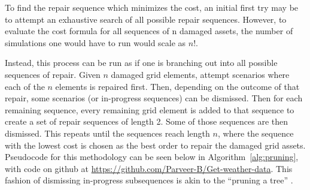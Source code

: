 \documentclass[12pt]{article}
\begin{document}
To find the repair sequence which minimizes the cost, an initial first try may be to attempt an exhaustive search of all possible repair sequences. However, to evaluate the cost formula for all sequences of n damaged assets, the number of simulations one would have to run would scale as $n!$. \par
Instead, this process can be run as if one is branching out into all possible sequences of repair. Given $n$ damaged grid elements, attempt scenarios where each of the $n$ elements is repaired first. Then, depending on the outcome of that repair, some scenarios (or in-progress sequences) can be dismissed. Then for each remaining sequence, every remaining grid element is added to that sequence to create a set of repair sequences of length 2. Some of those sequences are then dismissed. This repeats until the sequences reach length $n$, where the sequence with the lowest cost is chosen as the best order to repair the damaged grid assets. Pseudocode for this methodology can be seen below in Algorithm~\ref{alg:pruning}, with code on github at \url{https://github.com/Parveer-B/Get-weather-data}.  This fashion of dismissing in-progress subsequences is akin to the “pruning a tree” \cite{morelato}.
\end{document}

